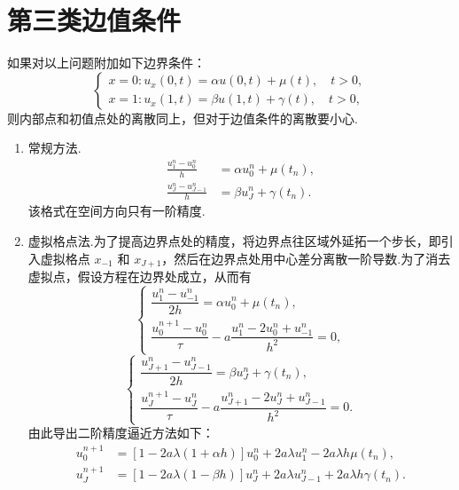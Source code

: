 \section{第三类边值条件}

如果对以上问题附加如下边界条件：
\begin{equation}
    \begin{cases}
        x=0 : u_x(0,t) = \alpha u(0,t) + \mu(t), \quad t > 0, \\
        x=1 : u_x(1,t) = \beta u(1,t) + \gamma(t), \quad t > 0,
    \end{cases}
\end{equation}
则内部点和初值点处的离散同上，但对于边值条件的离散要小心.
\begin{enumerate}
    \item 常规方法.
    \begin{align*}
        \frac{u_1^n - u_0^n}{h} &= \alpha u_0^n + \mu(t_n), \\
        \frac{u_J^n - u_{J-1}^n}{h} &= \beta u_J^n + \gamma(t_n).
    \end{align*}
    该格式在空间方向只有一阶精度.
    \item 虚拟格点法.为了提高边界点处的精度，将边界点往区域外延拓一个步长，即引入虚拟格点 $x_{-1}$ 和 $x_{J+1}$，然后在边界点处用中心差分离散一阶导数.为了消去虚拟点，假设方程在边界处成立，从而有
    \begin{equation}
        \begin{cases}
            \dfrac{u_1^n - u_{-1}^n}{2h} = \alpha u_0^n + \mu(t_n), \\[7pt]
            \dfrac{u_0^{n+1}-u_0^n}{\tau} - a\dfrac{u_{1}^n-2u_0^n+u_{-1}^n}{h^2} = 0,
        \end{cases}
    \end{equation}
    \begin{equation}
        \begin{cases}
            \dfrac{u_{J+1}^n - u_{J-1}^n}{2h} = \beta u_J^n + \gamma(t_n), \\[7pt]
            \dfrac{u_J^{n+1}-u_J^n}{\tau} - a\dfrac{u_{J+1}^n-2u_J^n+u_{J-1}^n}{h^2} = 0.
        \end{cases}
    \end{equation}
    由此导出二阶精度逼近方法如下：
    \begin{align*}
        u_0^{n+1} &= [1 - 2a\lambda(1 + \alpha h)]u_0^n + 2a\lambda u_1^n - 2a\lambda h\mu(t_n), \\
        u_J^{n+1} &= [1 - 2a\lambda(1 - \beta h)]u_J^n + 2a\lambda u_{J-1}^n + 2a\lambda h\gamma(t_n).
    \end{align*}

    \begin{figure}[H]
        \centering
        
    \end{figure}

\end{enumerate}


